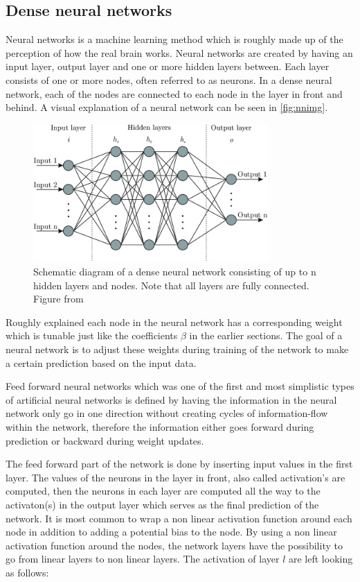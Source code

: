 \documentclass[../main.tex]{subfiles}
\begin{document}
\subsection{Dense neural networks}
Neural networks is a machine learning method which is roughly made up of the perception of how the real brain works. Neural networks are created by having an input layer, output layer and one or more hidden layers between. Each layer consists of one or more nodes, often referred to as neurons. In a dense neural network, each of the nodes are connected to each node in the layer in front and behind. A visual explanation of a neural network can be seen in \autoref{fig:nnimg}.\\

\begin{figure}[h]
    \centering
    \includegraphics[width=0.8\textwidth]{figures/neuralnet.png}
    \caption{Schematic diagram of a dense neural network consisting of up to n hidden layers and nodes. Note that all layers are fully connected.
 Figure from \cite{cite:nnfig}}
    \label{fig:nnimg}
\end{figure}

Roughly explained each node in the neural network has a corresponding weight which is tunable just like the coefficients $\beta$ in the earlier sections. The goal of a neural network is to adjust these weights during training of the network to make a certain prediction based on the input data. 

Feed forward neural networks which was one of the first and most simplistic types of artificial neural networks \cite{Schmidhuber_2015} is defined by having the information in the neural network only go in one direction without creating cycles of information-flow within the network, therefore the information either goes forward during prediction or backward during weight updates.

The feed forward part of the network is done by inserting input values in the first layer. The values of the neurons in the layer in front, also called activation's are computed, then the neurons in each layer are computed all the way to the activaton(s) in the output layer which serves as the final prediction of the network. It is most common to wrap a non linear activation function around each node in addition to adding a potential bias to the node. By using a non linear activation function around the nodes, the network layers have the possibility to go from linear layers to non linear layers. The activation of layer $l$ are left looking as follows:
\end{document}
